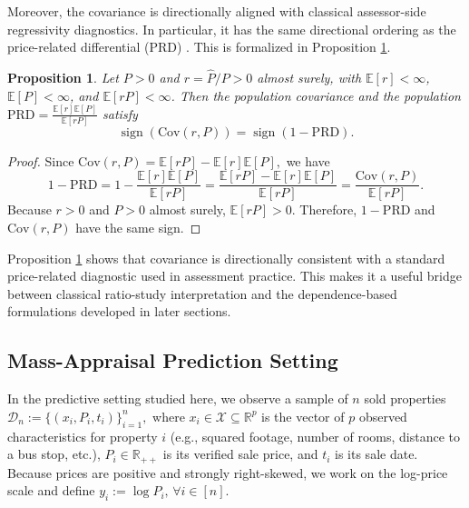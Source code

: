\documentclass[12pt, draft]{article}
\theoremstyle{plain}
\newtheorem{proposition}{Proposition}
\theoremstyle{definition}
\newcommand{\R}{\mathbb{R}}
\newcommand{\1}{\mathbf{1}}
\newcommand{\Cov}{\text{Cov}}
\renewcommand{\R}{\mathbb{R}}
\newcommand{\Expected}[1]{\mathbb{E}[#1]}
\begin{document}
Moreover, the covariance is directionally aligned with classical assessor-side regressivity diagnostics. In particular, it has the same directional ordering as the price-related differential (PRD) \cite{IAAO2025ExposureRatio}. This is formalized in Proposition \ref{prop:cov_prd}.

\begin{proposition}
\label{prop:cov_prd}
Let $P>0$ and $r=\widehat P/P>0$ almost surely, with $\Expected{r}<\infty$, $\Expected{P}<\infty$, and $\Expected{rP}<\infty$. Then the population covariance  and the population
$
\mathrm{PRD}=\frac{\Expected{r}\Expected{P}}{\Expected{rP}}
$
satisfy
\begin{equation}
\label{eq:cov_prd_sign}
\operatorname{sign}\!\left(\Cov(r,P)\right)
=
\operatorname{sign}\!\left(1-\mathrm{PRD}\right).
\end{equation}
\end{proposition}

\begin{proof}
Since
$
\Cov(r,P)=\Expected{rP}-\Expected{r}\Expected{P},
$
we have
\[
1-\mathrm{PRD}
=
1-\frac{\Expected{r}\Expected{P}}{\Expected{rP}}
=
\frac{\Expected{rP}-\Expected{r}\Expected{P}}{\Expected{rP}}
=
\frac{\Cov(r,P)}{\Expected{rP}}.
\]
Because $r>0$ and $P>0$ almost surely, $\Expected{rP}>0$. Therefore, $1-\mathrm{PRD}$ and $\Cov(r,P)$ have the same sign.
\end{proof}

Proposition \ref{prop:cov_prd} shows that covariance is directionally consistent with a standard price-related diagnostic used in assessment practice. This makes it a useful bridge between classical ratio-study interpretation and the dependence-based formulations developed in later sections.

\subsection{Mass-Appraisal Prediction Setting}
\label{subsec:prediction_setting}


In the predictive setting studied here, we observe a sample of $n$ sold properties $
\mathcal D_n := \{(x_i,P_i,t_i)\}_{i=1}^n,
$
where $x_i\in\mathcal X\subseteq \R^p$ is the vector of $p$ observed characteristics for property $i$ (e.g., squared footage, number of
rooms, distance to a bus stop, etc.), $P_i\in\mathbb R_{++}$ is its verified sale price, and $t_i$ is its sale date. Because prices are positive and strongly right-skewed, we work on the log-price scale and define
$
y_i := \log P_i,
\, \forall i\in[n].
$
\end{document}
